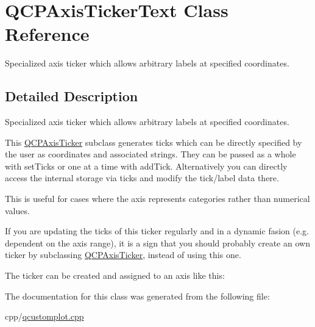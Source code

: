 \hypertarget{class_q_c_p_axis_ticker_text}{}\section{Q\+C\+P\+Axis\+Ticker\+Text Class Reference}
\label{class_q_c_p_axis_ticker_text}


Specialized axis ticker which allows arbitrary labels at specified coordinates.  




\subsection{Detailed Description}
Specialized axis ticker which allows arbitrary labels at specified coordinates. 



This \mbox{\hyperlink{class_q_c_p_axis_ticker}{Q\+C\+P\+Axis\+Ticker}} subclass generates ticks which can be directly specified by the user as coordinates and associated strings. They can be passed as a whole with set\+Ticks or one at a time with add\+Tick. Alternatively you can directly access the internal storage via ticks and modify the tick/label data there.

This is useful for cases where the axis represents categories rather than numerical values.

If you are updating the ticks of this ticker regularly and in a dynamic fasion (e.\+g. dependent on the axis range), it is a sign that you should probably create an own ticker by subclassing \mbox{\hyperlink{class_q_c_p_axis_ticker}{Q\+C\+P\+Axis\+Ticker}}, instead of using this one.

The ticker can be created and assigned to an axis like this\+: 
\begin{DoxyCodeInclude}
\end{DoxyCodeInclude}


The documentation for this class was generated from the following file\+:\begin{DoxyCompactItemize}
\item 
cpp/\mbox{\hyperlink{qcustomplot_8cpp}{qcustomplot.\+cpp}}\end{DoxyCompactItemize}
